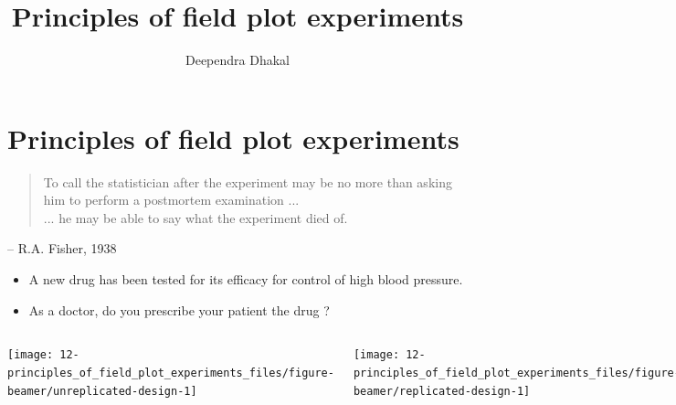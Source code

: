\documentclass[
  ignorenonframetext,
  aspectratio=169]{beamer}
\title{Principles of field plot experiments}
\author{Deependra Dhakal}
\date{}
\institute{Assistant Professor \and Agriculture and Forestry
University \and \url{https://rookie.rbind.io}}
\providecommand{\tightlist}{%
  \setlength{\itemsep}{0pt}\setlength{\parskip}{0pt}}
\begin{document}
\frame{\titlepage}

\begin{frame}[allowframebreaks]
  \tableofcontents[hideallsubsections]
\end{frame}
\hypertarget{principles-of-field-plot-experiments}{%
\section{Principles of field plot
experiments}\label{principles-of-field-plot-experiments}}

\begin{frame}{}
\protect\hypertarget{section}{}
\begin{quote}
To call the statistician after the experiment may be no more than asking him to perform a postmortem examination ...\\[1cm]

... he may be able to say what the experiment died of. 

\end{quote}

\hfill \raggedright -- R.A. Fisher, 1938
\end{frame}

\begin{frame}{}
\protect\hypertarget{section-1}{}
\footnotesize

\begin{itemize}[<+->]
\tightlist
\item
  A new drug has been tested for its efficacy for control of high blood
  pressure.
\item
  As a doctor, do you prescribe your patient the drug ?
\end{itemize}

\begin{columns}[T, onlytextwidth]

\texttt{[image: 12-principles\_of\_field\_plot\_experiments\_files/figure-beamer/unreplicated-design-1]}


\texttt{[image: 12-principles\_of\_field\_plot\_experiments\_files/figure-beamer/replicated-design-1]}

\end{columns}
\end{frame}
\end{document}
